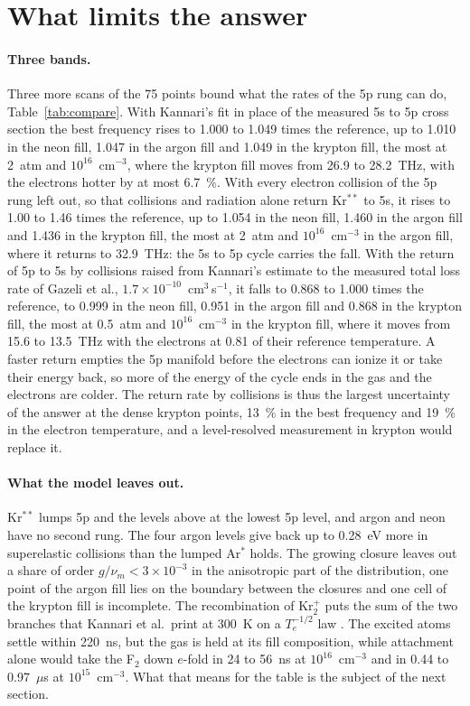 \documentclass[11pt]{article}
\begin{document}
\section{What limits the answer}
\label{sec:limits}

\paragraph{Three bands.}
Three more scans of the 75 points bound what the rates of the 5p rung can do, Table~\ref{tab:compare}. With
Kannari's fit in place of the measured 5s to 5p cross section the best frequency rises to 1.000 to 1.049 times the
reference, up to 1.010 in the neon fill, 1.047 in the argon fill and 1.049 in the krypton fill, the most at 2~atm
and $10^{16}$~cm$^{-3}$, where the krypton fill moves from 26.9 to 28.2~THz, with the electrons hotter by at most
6.7~\%. With every electron collision of the 5p rung left out, so that collisions and radiation alone return
Kr$^{**}$ to 5s, it rises to 1.00 to 1.46 times the reference, up to 1.054 in the neon fill, 1.460 in the argon
fill and 1.436 in the krypton fill, the most at 2~atm and $10^{16}$~cm$^{-3}$ in the argon fill, where it returns
to 32.9~THz: the 5s to 5p cycle carries the fall. With the return of 5p to 5s by collisions raised from Kannari's
estimate to the measured total loss rate of Gazeli et al., $1.7\times10^{-10}$~cm$^3$\,s$^{-1}$, it falls to 0.868
to 1.000 times the reference, to 0.999 in the neon fill, 0.951 in the argon fill and 0.868 in the krypton fill, the
most at 0.5~atm and $10^{16}$~cm$^{-3}$ in the krypton fill, where it moves from 15.6 to 13.5~THz with the
electrons at 0.81 of their reference temperature. A faster return empties the 5p manifold before the electrons can
ionize it or take their energy back, so more of the energy of the cycle ends in the gas and the electrons are
colder. The return rate by collisions is thus the largest uncertainty of the answer at the dense krypton points,
13~\% in the best frequency and 19~\% in the electron temperature, and a level-resolved measurement in krypton
\cite{Whitehead1995} would replace it.

\paragraph{What the model leaves out.}
Kr$^{**}$ lumps 5p and the levels above at the lowest 5p level, and argon and neon have no second rung. The four
argon levels give back up to 0.28~eV more in superelastic collisions than the lumped Ar$^*$ holds. The growing
closure leaves out a share of order $g/\nu_m<3\times10^{-3}$ in the anisotropic part of the distribution, one
point of the argon fill lies on the boundary between the closures and one cell of the krypton fill is incomplete.
The recombination of Kr$_2^+$ puts the sum of the two branches that Kannari et al.\ print at 300~K on a
$T_e^{-1/2}$ law \cite{Kannari1985}. The excited atoms settle within 220~ns, but the gas is held at its fill
composition, while attachment alone would take the F$_2$ down $e$-fold in 24 to 56~ns at $10^{16}$~cm$^{-3}$ and
in 0.44 to 0.97~$\mu$s at $10^{15}$~cm$^{-3}$. What that means for the table is the subject of the next section.
\end{document}
